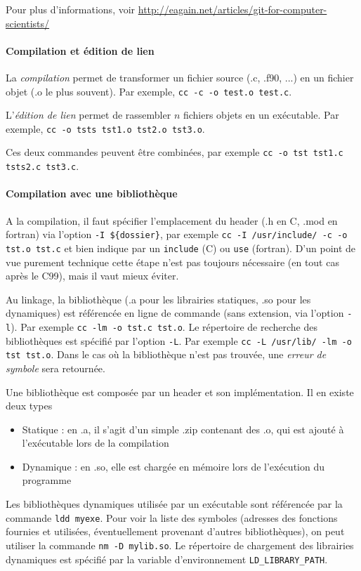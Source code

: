 \documentclass{article}
\begin{document}
Pour plus d'informations, voir \url{http://eagain.net/articles/git-for-computer-scientists/}


\paragraph{Compilation et édition de lien}
La \emph{compilation} permet de transformer un fichier source (.c, .f90, ...) en un fichier objet (.o le plus souvent). Par exemple, \texttt{cc -c -o test.o test.c}.


L'\emph{édition de lien} permet de rassembler $n$ fichiers objets en un exécutable. Par exemple, \texttt{cc -o tsts tst1.o tst2.o tst3.o}.

Ces deux commandes peuvent être combinées, par exemple \texttt{cc -o tst tst1.c tsts2.c tst3.c}.


\paragraph{Compilation avec une bibliothèque} A la compilation, il faut spécifier l'emplacement du header (.h en C, .mod en fortran) via l'option \texttt{-I \$\{dossier\}}, par exemple \texttt{cc -I /usr/include/ -c -o tst.o tst.c} et bien indique par un \texttt{include} (C) ou \texttt{use} (fortran). D'un point de vue purement technique cette étape n'est pas toujours nécessaire (en tout cas après le C99), mais il vaut mieux éviter.

Au linkage, la bibliothèque (.a pour les librairies statiques, .so pour les dynamiques) est référencée en ligne de commande (sans extension, via l'option \texttt{-l}). Par exemple \texttt{cc -lm -o tst.c tst.o}. Le répertoire de recherche des bibliothèques est spécifié par l'option \texttt{-L}. Par exemple \texttt{cc -L /usr/lib/ -lm -o tst tst.o}. Dans le cas où la bibliothèque n'est pas trouvée, une \emph{erreur de symbole} sera retournée.
\bigskip

Une bibliothèque est composée par un header et son implémentation. Il en existe deux types
\begin{itemize}
\item Statique : en .a, il s'agit d'un simple .zip contenant des .o, qui est ajouté à l'exécutable lors de la compilation
\item Dynamique : en .so, elle est chargée en mémoire lors de l'exécution du programme
\end{itemize}

Les bibliothèques dynamiques utilisée par un exécutable sont référencée par la commande \texttt{ldd myexe}. Pour voir la liste des symboles (adresses des fonctions fournies et utilisées, éventuellement provenant d'autres bibliothèques), on peut utiliser la commande \texttt{nm -D mylib.so}. Le répertoire de chargement des librairies dynamiques est spécifié par la variable d'environnement \texttt{LD\_LIBRARY\_PATH}.
\end{document}
